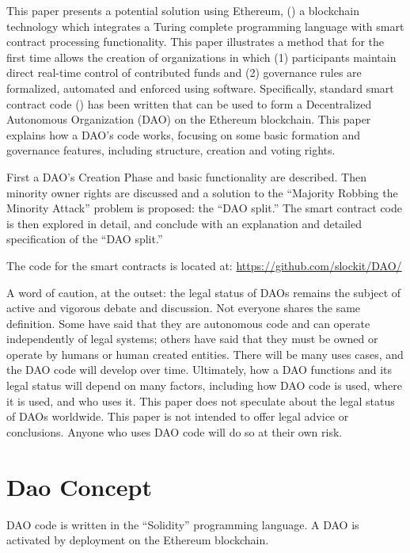 \documentclass[9pt,oneside]{amsart}
\begin{document}
\begin{multicols}{2}
This paper presents a potential solution using Ethereum, (\cite{buterin2013ethereum,Wood2014ethereum}) a blockchain technology which integrates a Turing complete programming language with smart contract processing functionality. This paper illustrates a method that for the first time allows the creation of organizations in which (1) participants maintain direct real-time control of contributed funds and (2)  governance rules are formalized, automated and enforced using software. Specifically, standard smart contract code (\cite{szabo1997formalizing, miller1997future}) has been written that can be used to form a Decentralized Autonomous Organization (DAO) on the Ethereum blockchain. This paper explains how a DAO's code works, focusing on some basic formation and governance features, including structure, creation and voting rights.

First a DAO's Creation Phase and basic functionality are described. Then minority owner rights are discussed and a solution to the ``Majority Robbing the Minority Attack'' problem is proposed: the ``DAO split.'' The smart contract code is then explored in detail, and conclude with an explanation and detailed specification of the ``DAO split.''

The code for the smart contracts is located at: \url{https://github.com/slockit/DAO/}

A word of caution, at the outset:  the legal status of DAOs remains the subject of active and vigorous debate and discussion. Not everyone shares the same definition. Some have said that they are autonomous code and can operate independently of legal systems; others have said that they must be owned or operate by humans or human created entities. There will be many uses cases, and the DAO code will develop over time. Ultimately, how a DAO functions and its legal status will depend on many factors, including how DAO code is used, where it is used, and who uses it. This paper does not speculate about the legal status of DAOs worldwide. This paper is not intended to offer legal advice or conclusions. Anyone who uses DAO code will do so at their own risk.



\section{Dao Concept}

DAO code is written in the ``Solidity'' programming language. A DAO is activated by deployment on the Ethereum blockchain. 


\end{multicols}
\end{document}
